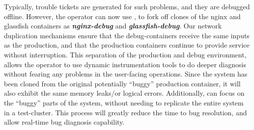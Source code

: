 Typically, trouble tickets are generated for such problems, and they are debugged offline.
However, the operator can now use \parikshan, to fork off clones of the nginx and glassfish containers as \textbf{\textit{nginx-debug}} and \textbf{\textit{glassfish-debug}}.
Our network duplication mechanisms ensure that the debug-containers receive the same inputs as the production, and that the production containers continue to provide service without interruption.
This separation of the production and debug environment, allows the operator to use dynamic instrumentation tools to do deeper diagnosis without fearing any problems in the user-facing operations.
Since the system has been cloned from the original potentially ``buggy'' production container, it will also exhibit the same memory leaks/or logical errors.
Additionally, \parikshan can focus on the ``buggy'' parts of the system, without needing to replicate the entire system in a test-cluster.
This process will greatly reduce the time to bug resolution, and allow real-time bug diagnosis capability.

